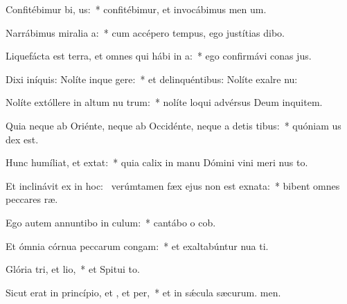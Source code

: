 \item Confitébimur bi, us:~* confitébimur, et invocábimus men um.
\item Narrábimus miralia a:~* cum accépero tempus, ego justítias dibo.
\item Liquefácta est terra, et omnes qui hábi in a:~* ego confirmávi conas jus.
\item Dixi iníquis: Nolíte inque gere:~* et delinquéntibus: Nolíte exalre nu:
\item Nolíte extóllere in altum nu trum:~* nolíte loqui advérsus Deum inquitem.
\item Quia neque ab Oriénte, neque ab Occidénte, neque a detis tibus:~* quóniam us dex est.
\item Hunc humíliat, et  extat:~* quia calix in manu Dómini vini meri nus to.
\item Et inclinávit ex  in hoc:~\pscross{} verúmtamen fæx ejus non est exnata:~* bibent omnes peccares ræ.
\item Ego autem annuntibo in culum:~* cantábo o cob.
\item Et ómnia córnua peccarum congam:~* et exaltabúntur nua ti.
\item Glória tri, et lio,~* et Spitui to.
\item Sicut erat in princípio, et , et per,~* et in sǽcula sæcurum. men.
